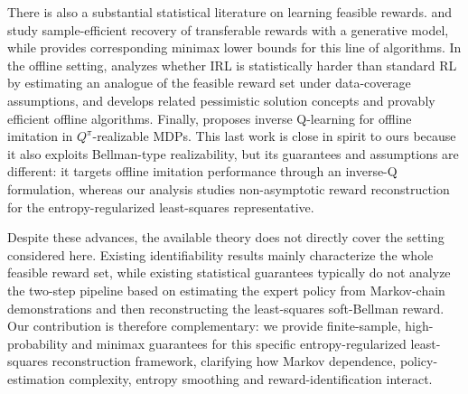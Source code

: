 \documentclass{article}
\theoremstyle{definition}
\theoremstyle{remark}
\theoremstyle{plain}
\numberwithin{equation}{section}
\begin{document}
There is also a substantial statistical literature on learning feasible rewards. \cite{ramponi2021efficient} and \cite{metelli2021provably} study sample-efficient recovery of transferable rewards with a generative model, while \cite{metelli2023towards} provides corresponding minimax lower bounds for this line of algorithms. In the offline setting, \cite{zhao2024inverse} analyzes whether IRL is statistically harder than standard RL by estimating an analogue of the feasible reward set under data-coverage assumptions, and \cite{lazzati2024offline}  develops related pessimistic solution concepts and provably efficient offline algorithms. Finally, \cite{moulin2025inverse} proposes inverse Q-learning for offline imitation in $Q^{\pi}$-realizable MDPs. This last work is close in spirit to ours because it also exploits Bellman-type realizability, but its guarantees and assumptions are different: it targets offline imitation performance through an inverse-Q formulation, whereas our analysis studies non-asymptotic reward reconstruction for the entropy-regularized least-squares representative.

Despite these advances, the available theory does not directly cover the setting considered here. Existing identifiability results mainly characterize the whole feasible reward set, while existing statistical guarantees typically do not analyze the two-step pipeline based on estimating the expert policy from Markov-chain demonstrations and then reconstructing the least-squares soft-Bellman reward. Our contribution is therefore complementary: we provide finite-sample, high-probability and minimax guarantees for this specific entropy-regularized least-squares reconstruction framework, clarifying how Markov dependence, policy-estimation complexity, entropy smoothing and reward-identification interact.
\end{document}
